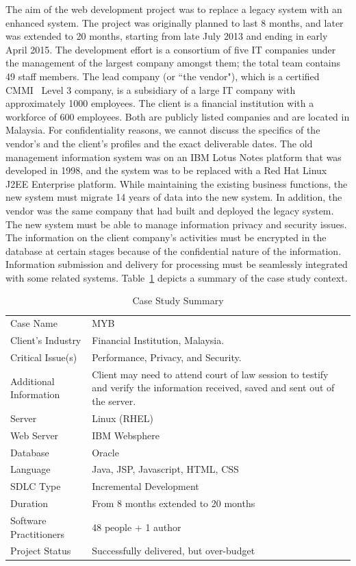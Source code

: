 \documentclass[conference]{IEEEtran}
\begin{document}

The aim of the web development project was to replace a legacy system
with an enhanced system. The project was originally planned to last 8
months, and later was extended to 20 months, starting from late July
2013 and ending in early April 2015. The development effort is a
consortium of five IT companies under the management of the largest
company amongst them; the total team contains 49 staff members. The
lead company (or ``the vendor"), which is a certified
CMMI~\cite{ProductCMMIfor2010} Level 3 company, is a subsidiary of a
large IT company with approximately 1000 employees. The client is a
financial institution with a workforce of 600 employees. Both are
publicly listed companies and are located in Malaysia. For
confidentiality reasons, we cannot discuss the specifics of the
vendor's and the client's profiles and the exact deliverable
dates. The old management information system was on an IBM Lotus Notes
platform that was developed in 1998, and the system was to be replaced
with a Red Hat Linux J2EE Enterprise platform. While maintaining the
existing business functions, the new system must migrate 14 years of
data into the new system. In addition, the vendor was the same company
that had built and deployed the legacy system. The new system must be
able to manage information privacy and security issues. The
information on the client company's activities must be encrypted in
the database at certain stages because of the confidential nature of
the information. Information submission and delivery for processing
must be seamlessly integrated with some related
systems. Table~\ref{casestudycontext} depicts a summary of the case
study context.

\begin{table}
\centering
\caption{Case Study Summary}
\label{casestudycontext}
\begin{tabular}{l p{5cm}} 
\hline
Case Name & MYB 
\\
Client's Industry & Financial Institution, Malaysia.
\\
Critical Issue(s) & Performance, Privacy, and Security.
\\
Additional Information & Client may need to attend court of law session to testify and verify the information received, saved and sent out of the server. 
\\
Server & Linux (RHEL)
\\
Web Server & IBM Websphere
\\
Database & Oracle
\\
Language & Java, JSP, Javascript, HTML, CSS
\\
SDLC Type & Incremental Development
\\
Duration & From 8 months extended to 20 months
\\
Software Practitioners & 48 people + 1 author 
\\
Project Status & Successfully delivered, but over-budget
\\
\hline
\end{tabular}
\end{table}
\end{document}

